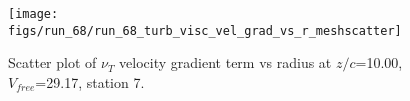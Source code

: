 \begin{figure}[H]
\centering
\texttt{[image: figs/run\_68/run\_68\_turb\_visc\_vel\_grad\_vs\_r\_meshscatter]}
\caption{Scatter plot of $\nu_T$ velocity gradient term vs radius at $z/c$=10.00, $V_{free}$=29.17, station 7.}
\label{fig:run_68_turb_visc_vel_grad_vs_r_meshscatter}
\end{figure}


